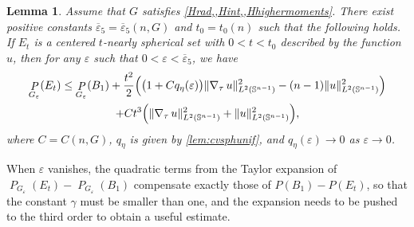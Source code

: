 \documentclass[JEP,XML,SOM,Unicode,published]{cedram}
\numberwithin{equation}{section}
\theoremstyle{plain}
\newtheorem{lem}[thm]{Lemma}
\theoremstyle{definition}
\newcommand{\bbS}{\mathbb{S}}
\let\eps\varepsilon
\let\ol\overline
\newcommand{\grad}{\nabla}
\DeclareMathOperator{\Per}{\mathit{P}}
\DeclarePairedDelimiter{\norm}{\lVert}{\rVert}
\begin{document}
\begin{lem}\label{lem:fuglede}
Assume that $G$ satisfies \cref{Hrad,,Hint,,Hhighermoments}.
There exist positive constants $\ol{\eps}_5=\ol{\eps}_5(n,G)$ and $t_0=t_0(n)$ such that the
following holds.
If $E_t$ is a centered $t$-nearly spherical set with $0<t<t_0$ described by the function $u$, then
for any $\eps$ such that $0<\eps<\ol{\eps}_5$, we have
\begin{multline}\label{eq:resfuglede}
\Per_{G_\eps}(E_t)
\leq \Per_{G_\eps}(B_1)+\frac{t^2}{2}
\Bigl(\big(1+Cq_\eta(\eps)\big)\norm{\grad_\tau\, u}_{L^2(\bbS^{n-1})}^2
-(n-1)\norm{u}_{L^2(\bbS^{n-1})}^2\Bigr)\\
+Ct^3\Bigl(\norm{\grad_\tau\, u}_{L^2(\bbS^{n-1})}^2+\norm{u}_{L^2(\bbS^{n-1})}^2\Bigr),
\end{multline}
where $C=C(n,G)$, $q_\eta$ is given by \cref{lem:cvsphunif}, and $q_\eta(\eps)\to 0$ as $\eps\to 0$.
\end{lem}

When $\eps$ vanishes, the quadratic terms from the Taylor expansion of
$\Per_{G_\eps}(E_t)-\Per_{G_\eps}(B_1)$ compensate exactly those of $P(B_1)-P(E_t)$, so that
the constant $\gamma$ must be smaller than one, and the expansion needs to be pushed to the third
order to obtain a useful estimate.
\end{document}
